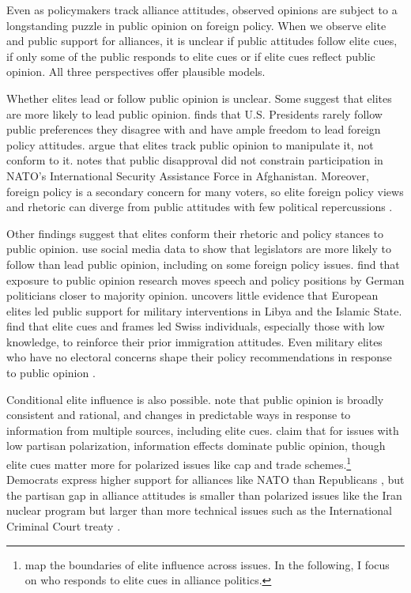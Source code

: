 \documentclass[12pt]{article}
\begin{document}
Even as policymakers track alliance attitudes, observed opinions are subject to a longstanding puzzle in public opinion on foreign policy.
When we observe elite and public support for alliances, it is unclear if public attitudes follow elite cues, if only some of the public responds to elite cues or if elite cues reflect public opinion. 
All three perspectives offer plausible models. 


Whether elites lead or follow public opinion is unclear.
Some suggest that elites are more likely to lead public opinion. 
\citet{Canes-Wrone2006} finds that U.S. Presidents rarely follow public preferences they disagree with and have ample freedom to lead foreign policy attitudes. 
\citet{JacobsShapiro2000} argue that elites track public opinion to manipulate it, not conform to it. 
\citet{Kreps2010} notes that public disapproval did not constrain participation in NATO's International Security Assistance Force in Afghanistan. 
Moreover, foreign policy is a secondary concern for many voters, so elite foreign policy views and rhetoric can diverge from public attitudes with few political repercussions \citep{BusbyMonten2012}. 


Other findings suggest that elites conform their rhetoric and policy stances to public opinion. 
\citet{Barberaetal2019} use social media data to show that legislators are more likely to follow than lead public opinion, including on some foreign policy issues. 
\citet{HagerHilbig2020} find that exposure to public opinion research moves speech and policy positions by German politicians closer to majority opinion. 
\citet{Haesebrouck2019} uncovers little evidence that European elites led public support for military interventions in Libya and the Islamic State. 
\citet{Bechteletal2015} find that elite cues and frames led Swiss individuals, especially those with low knowledge, to reinforce their prior immigration attitudes. 
Even military elites who have no electoral concerns shape their policy recommendations in response to public opinion \citep{LinGreenberg2021}. 


Conditional elite influence is also possible. 
\citet{PageShapiro1992} note that public opinion is broadly consistent and rational, and changes in predictable ways in response to information from multiple sources, including elite cues. 
\citet{GuisingerSaunders2017} claim that for issues with low partisan polarization, information effects dominate public opinion, though elite cues matter more for polarized issues like cap and trade schemes.\footnote{\citet{GuisingerSaunders2017} map the boundaries of elite influence across issues. In the following, I focus on who responds to elite cues in alliance politics.}
Democrats express higher support for alliances like NATO than Republicans \citep{PewNATO2020}, but the partisan gap in alliance attitudes is smaller than polarized issues like the Iran nuclear program but larger than more technical issues such as the International Criminal Court treaty \citet{GuisingerSaunders2017}. 
\end{document}

